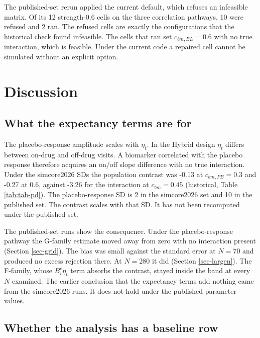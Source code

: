 \documentclass[
  11pt,
]{article}
\begin{document}
The published-set rerun applied the current default, which refuses an
infeasible matrix. Of its 12 strength-0.6 cells on the
three correlation pathways, 10 were refused and
2 ran. The refused cells are exactly the configurations
that the historical check found infeasible. The cells that ran set
\(c_{bm,BL} = 0.6\) with no true interaction, which is feasible. Under
the current code a repaired cell cannot be simulated without an
explicit option.

\section{Discussion}\label{sec-discussion}

\subsection{What the expectancy terms are for}\label{sec-expectancy}

The placebo-response amplitude scales with \(\eta_t\). In the Hybrid
design \(\eta_t\) differs between on-drug and off-drug visits. A
biomarker correlated with the placebo response therefore acquires an
on/off slope difference with no true interaction. Under the
simcore2026 SDs the population contrast was -0.13 at
\(c_{bm,PB} = 0.3\) and -0.27 at 0.6, against
-3.26 for the interaction at \(c_{bm} = 0.45\) (historical,
Table \ref{tab:tab-pd}). The placebo-response SD is
2 in the simcore2026 set and 10 in the
published set. The contrast scales with that SD. It has not been
recomputed under the published set.

The published-set runs show the consequence. Under the
placebo-response pathway the G-family estimate moved away from zero
with no interaction present (Section \ref{sec-grid}). The bias was
small against the standard error at \(N = 70\) and produced no excess
rejection there. At \(N = 280\) it did (Section \ref{sec-largen}).
The F-family, whose \(B^c_i\eta_t\) term absorbs the contrast, stayed
inside the band at every \(N\) examined. The earlier conclusion that
the expectancy terms add nothing came from the simcore2026 runs. It
does not hold under the published parameter values.

\subsection{Whether the analysis has a baseline row}\label{sec-baselinerow}
\end{document}
